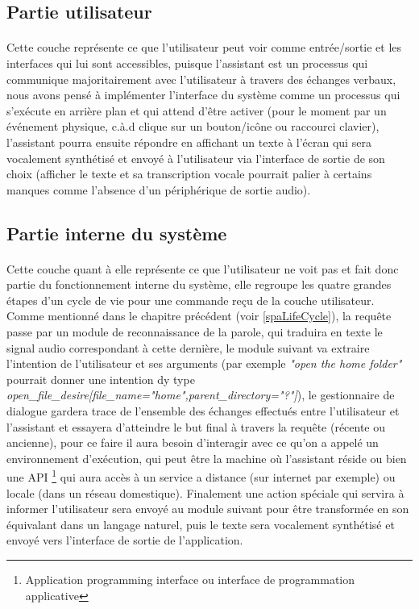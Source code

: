 	\subsection{Partie utilisateur}
	\paragraph{}
	Cette couche représente ce que l'utilisateur peut voir comme entrée/sortie et les interfaces qui lui sont accessibles, puisque l'assistant est un processus qui communique majoritairement avec l'utilisateur à travers des échanges verbaux, nous avons pensé à implémenter l'interface du système comme un processus qui s'exécute en arrière plan et qui attend d'être activer (pour le moment par un événement physique, c.à.d clique sur un bouton/icône ou raccourci clavier), l'assistant pourra ensuite répondre en affichant un texte à l'écran qui sera vocalement synthétisé et envoyé à l'utilisateur via l'interface de sortie de son choix (afficher le texte et sa transcription vocale pourrait palier à certains manques comme l'absence d'un périphérique de sortie audio).
	\subsection{Partie interne du système}
	
	\paragraph{}
	\label{system_layer}
	Cette couche quant à elle représente ce que l'utilisateur ne voit pas et fait donc partie du fonctionnement interne du système, elle regroupe les quatre grandes étapes d'un cycle de vie pour une commande reçu de la couche utilisateur. Comme mentionné dans le chapitre précédent (voir \ref{spaLifeCycle}), la requête passe par un module de reconnaissance de la parole, qui traduira en texte le signal audio correspondant à cette dernière, le module suivant va extraire l'intention de l'utilisateur et ses arguments (par exemple \textit{"open the home folder"} pourrait donner  une intention dy type  \textit{open\_file\_desire[file\_name="home",parent\_directory="?"]}), le gestionnaire de dialogue gardera trace de l'ensemble des échanges effectués entre l'utilisateur et l'assistant et essayera d'atteindre le but final à travers la requête (récente ou ancienne), pour ce faire il aura besoin d'interagir avec ce qu'on a appelé un environnement d'exécution, qui peut être la machine où l'assistant réside ou bien une API \footnote{Application programming interface ou interface de programmation applicative } qui aura accès à un service a distance (sur internet par exemple) ou locale (dans un réseau domestique). Finalement une action spéciale qui servira à informer l'utilisateur sera envoyé au module suivant pour être transformée en son équivalant dans un langage naturel, puis le texte sera vocalement synthétisé et envoyé vers l'interface de sortie de l'application.
	
